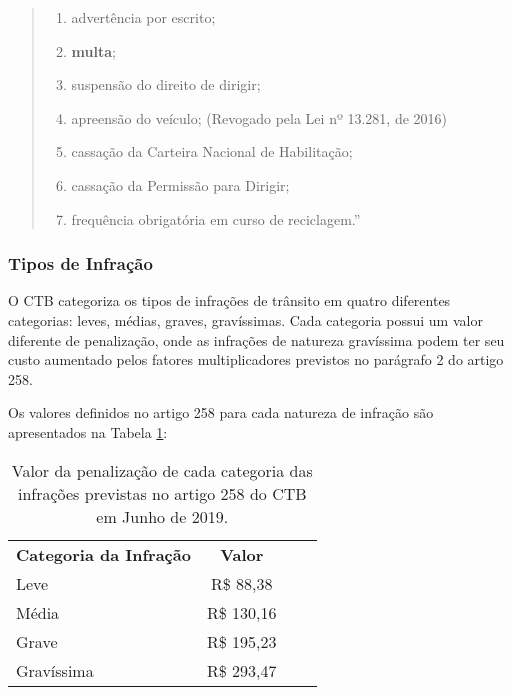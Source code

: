     \begin{quote}
            \renewcommand{\theenumi}{\Roman{enumi}}%
            \begin{enumerate}
                \item advertência por escrito;
                \item \textbf{multa};
                \item suspensão do direito de dirigir;
                \item apreensão do veículo; (Revogado pela Lei nº 13.281, de 2016)
                \item cassação da Carteira Nacional de Habilitação;
                \item cassação da Permissão para Dirigir;
                \item frequência obrigatória em curso de reciclagem.''
             \end{enumerate}
    \end{quote}
    

    \subsubsection{Tipos de Infração}

    O CTB categoriza os tipos de infrações de trânsito em quatro diferentes categorias: leves, médias, graves, gravíssimas. Cada categoria possui um valor diferente de penalização, onde as infrações de natureza gravíssima podem ter seu custo aumentado pelos fatores multiplicadores previstos no parágrafo 2 do artigo 258.
    
    Os valores definidos no artigo 258 para cada natureza de infração são apresentados na Tabela \ref{tabela_precos_infracoes_categorias}:
    
    \begin{table}[H]
        \centering
        \caption{Valor da penalização de cada categoria das infrações previstas no artigo 258 do CTB em Junho de 2019.}
        \begin{tabular}{|l|c|ll}
        \cline{1-2}
        \multicolumn{1}{|c|}{\textbf{Categoria da Infração}} & \textbf{Valor} &  &  \\ \cline{1-2}
        Leve & R\$ 88,38 &  &  \\ \cline{1-2}
        Média & R\$ 130,16 &  &  \\ \cline{1-2}
        Grave & R\$ 195,23 &  &  \\ \cline{1-2}
        Gravíssima & R\$ 293,47 &  &  \\ \cline{1-2}
        \end{tabular}
        \label{tabela_precos_infracoes_categorias}
    \end{table}
    
